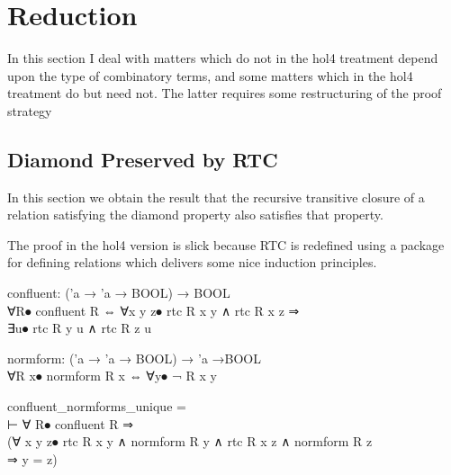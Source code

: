 \section{Reduction}

In this section I deal with matters which do not in the hol4 treatment depend upon the type of combinatory terms, and some matters which in the hol4 treatment do but need not.
The latter requires some restructuring of the proof strategy

\subsection{Diamond Preserved by RTC}

In this section we obtain the result that the recursive transitive closure of a relation satisfying the diamond property also satisfies that property.

The proof in the hol4 version is slick because RTC is redefined using a package for defining relations which delivers some nice induction principles.

\begin{HOLConst}
\+\PrNM{} \PrNL{}confluent\PrNN{}: ('a → 'a  → BOOL) → BOOL\\
\PrPH{}\PrPM{}\PrPM{}\PrPM{}\PrPM{}\PrPM{}\PrPM{}\PrPM{}\PrPM{}\PrPM{}\PrPM{}\PrPM{}
\+\PrNM{} ∀R⦁ confluent R ⇔ ∀x y z⦁ rtc R x y ∧ rtc R x z ⇒\\
\+\PrNM{}             ∃u⦁ rtc R y u ∧ rtc R z u\\
\end{HOLConst}

\begin{HOLConst}
\+\PrNM{} \PrNL{}normform\PrNN{}: ('a → 'a  → BOOL) → 'a →BOOL\\
\PrPH{}\PrPM{}\PrPM{}\PrPM{}\PrPM{}\PrPM{}\PrPM{}\PrPM{}\PrPM{}\PrPM{}\PrPM{}\PrPM{}
\+\PrNM{} ∀R x⦁ normform R x ⇔ ∀y⦁ ¬ R x y\\
\end{HOLConst}

\begin{GFT}{}
\+\PrNL{}confluent\_normforms\_unique\PrNN{} =\\
\+	⊢ ∀ R⦁ confluent R ⇒\\
\+		(∀ x y z⦁ rtc R x y ∧ normform R y ∧ rtc R x z ∧ normform R z\\
\+		⇒ y = z)\\
\end{GFT}

